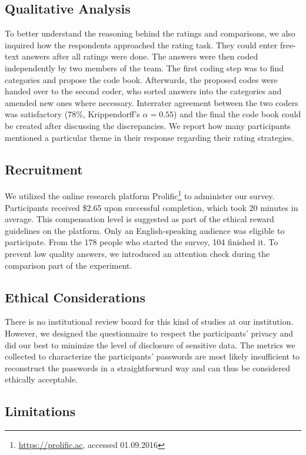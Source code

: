 \subsection{Qualitative Analysis}
To better understand the reasoning behind the ratings and comparisons, we also inquired how the respondents approached the rating task. They could enter free-text answers after all ratings were done. The answers were then coded independently by two members of the team. The first coding step was to find categories and propose the code book. Afterwards, the proposed codes were handed over to the second coder, who sorted answers into the categories and amended new ones where necessary. Interrater agreement between the two coders was satisfactory (78\%, Krippendorff's $\alpha = 0.55$) and the final the code book could be created after discussing the discrepancies. We report how many participants mentioned a particular theme in their response regarding their rating strategies.


\subsection{Recruitment}
We utilized the online research platform Prolific\footnote{\url{https://prolific.ac}, accessed 01.09.2016} to administer our survey. Participants received \$2.65 upon successful completion, which took 20 minutes in average. This compensation level is suggested as part of the ethical reward guidelines on the platform. Only an English-speaking audience was eligible to participate. From the 178 people who started the survey, 104 finished it. To prevent low quality answers, we introduced an attention check during the comparison part of the experiment.  



\subsection{Ethical Considerations}
There is no institutional review board for this kind of studies at our institution. However, we designed the questionnaire to respect the participants' privacy and did our best to minimize the level of disclosure of sensitive data. The metrics we collected to characterize the participants' passwords are most likely insufficient to reconstruct the passwords in a straightforward way and can thus be considered ethically acceptable. 


\subsection{Limitations}

